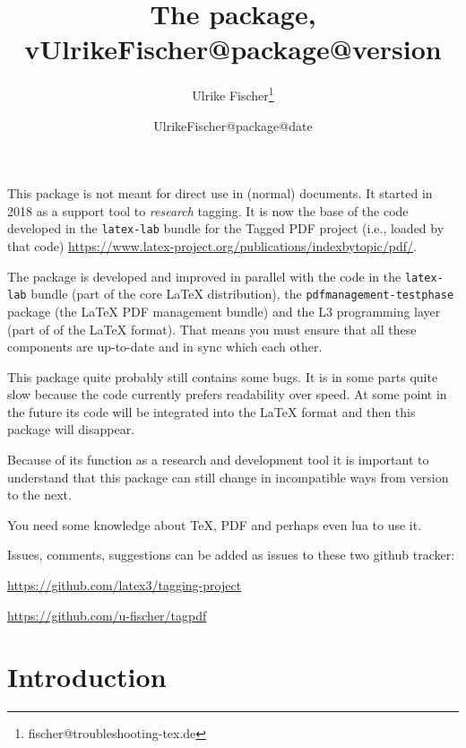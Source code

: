 \documentclass[bibliography=totoc,a4paper]{article}
\title{The \pkg{tagpdf} package, v\csname UlrikeFischer@package@version\endcsname}
\date{\csname UlrikeFischer@package@date\endcsname}
\author{Ulrike Fischer\thanks{fischer@troubleshooting-tex.de}}
\newcommand\pkg[1]{\texttt{#1}}
\newcommand\PDF{PDF}
\begin{document}
\maketitle

\begin{tcolorbox}[colframe=red,before upper=\tagpdfparaOn]

This package is not meant for direct use in (normal) documents. It started in 2018 as 
a support tool to \emph{research} tagging. It is now the base of the code developed 
in the \pkg{latex-lab} bundle for the Tagged PDF project (i.e., loaded by that code)
\url{https://www.latex-project.org/publications/indexbytopic/pdf/}. 

The package is developed and improved in parallel with the code in the \pkg{latex-lab} 
bundle (part of the core \LaTeX{} distribution),  the \pkg{pdfmanagement-testphase} 
package (the \LaTeX{} PDF management bundle) and the L3 programming layer (part of of the \LaTeX{} format). 
That means you must ensure that all these components are up-to-date and in 
sync which each other. 

This package quite probably still contains some bugs. It is in some parts quite slow because
the code currently prefers readability over speed. At some point in the future its code will 
be integrated into the \LaTeX{} format and then this package will disappear. 

Because of its function as a research and development tool it is
important to understand that this package can still change in
incompatible ways from version to the next.

You need some knowledge about \TeX, \PDF{} and perhaps even lua to use it.

\medskip

Issues, comments, suggestions can be added as issues to these two github tracker:

\medskip
\centering
\url{https://github.com/latex3/tagging-project}\par
\leavevmode{}
\url{https://github.com/u-fischer/tagpdf}

\end{tcolorbox}
\tagstructend



\tableofcontents



\section{Introduction}
\end{document}
